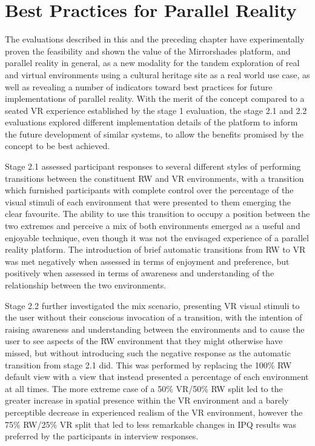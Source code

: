 \section{Best Practices for Parallel Reality}
\label{best-practices-for-parallel-reality}
The evaluations described in this and the preceding chapter have experimentally proven the feasibility and shown the value of the Mirrorshades platform, and parallel reality in general, as a new modality for the tandem exploration of real and virtual environments using a cultural heritage site as a real world use case, as well as revealing a number of indicators toward best practices for future implementations of parallel reality. With the merit of the concept compared to a seated VR experience established by the stage 1 evaluation, the stage 2.1 and 2.2 evaluations explored different implementation details of the platform to inform the future development of similar systems, to allow the benefits promised by the concept to be best achieved.

Stage 2.1 assessed participant responses to several different styles of performing transitions between the constituent RW and VR environments, with a transition which furnished participants with complete control over the percentage of the visual stimuli of each environment that were presented to them emerging the clear favourite. The ability to use this transition to occupy a position between the two extremes and perceive a mix of both environments emerged as a useful and enjoyable technique, even though it was not the envisaged experience of a parallel reality platform. The introduction of brief automatic transitions from RW to VR was met negatively when assessed in terms of enjoyment and preference, but positively when assessed in terms of awareness and understanding of the relationship between the two environments.

Stage 2.2 further investigated the mix scenario, presenting VR visual stimuli to the user without their conscious invocation of a transition, with the intention of raising awareness and understanding between the environments and to cause the user to see aspects of the RW environment that they might otherwise have missed, but without introducing such the negative response as the automatic transition from stage 2.1 did. This was performed by replacing the 100\% RW default view with a view that instead presented a percentage of each environment at all times. The more extreme case of a 50\% VR/50\% RW split led to the greater increase in spatial presence within the VR environment and a barely perceptible decrease in experienced realism of the VR environment, however the 75\% RW/25\% VR split that led to less remarkable changes in IPQ results was preferred by the participants in interview responses.

